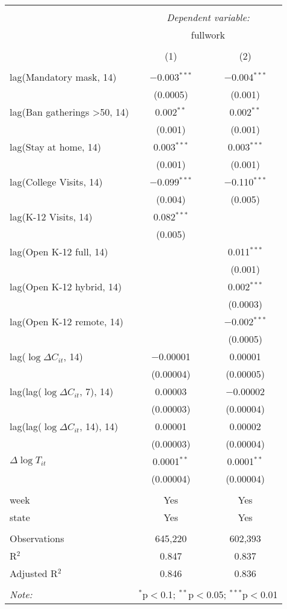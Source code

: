 \begin{tabular}{@{\extracolsep{1pt}}lcc} 
\\[-1.8ex]\hline 
\hline \\[-1.8ex] 
 & \multicolumn{2}{c}{\textit{Dependent variable:}} \\ 
\cline{2-3} 
 & \multicolumn{2}{c}{fullwork} \\ 
\\[-1.8ex] & (1) & (2)\\ 
\hline \\[-1.8ex] 
 lag(Mandatory mask, 14) & $-$0.003$^{***}$ & $-$0.004$^{***}$ \\ 
  & (0.0005) & (0.001) \\ 
  lag(Ban gatherings >50, 14) & 0.002$^{**}$ & 0.002$^{**}$ \\ 
  & (0.001) & (0.001) \\ 
  lag(Stay at home, 14) & 0.003$^{***}$ & 0.003$^{***}$ \\ 
  & (0.001) & (0.001) \\ 
  lag(College Visits, 14) & $-$0.099$^{***}$ & $-$0.110$^{***}$ \\ 
  & (0.004) & (0.005) \\ 
  lag(K-12 Visits, 14) & 0.082$^{***}$ &  \\ 
  & (0.005) &  \\ 
  lag(Open K-12 full, 14) &  & 0.011$^{***}$ \\ 
  &  & (0.001) \\ 
  lag(Open K-12 hybrid, 14) &  & 0.002$^{***}$ \\ 
  &  & (0.0003) \\ 
  lag(Open K-12 remote, 14) &  & $-$0.002$^{***}$ \\ 
  &  & (0.0005) \\ 
  lag($\log \Delta C_{it}$, 14) & $-$0.00001 & 0.00001 \\ 
  & (0.00004) & (0.00005) \\ 
  lag(lag($\log \Delta C_{it}$, 7), 14) & 0.00003 & $-$0.00002 \\ 
  & (0.00003) & (0.00004) \\ 
  lag(lag($\log \Delta C_{it}$, 14), 14) & 0.00001 & 0.00002 \\ 
  & (0.00003) & (0.00004) \\ 
  $\Delta \log T_{it}$ & 0.0001$^{**}$ & 0.0001$^{**}$ \\ 
  & (0.00004) & (0.00004) \\ 
 \hline \\[-1.8ex] 
week & Yes & Yes \\ 
state & Yes & Yes \\ 
\hline \\[-1.8ex] 
Observations & 645,220 & 602,393 \\ 
R$^{2}$ & 0.847 & 0.837 \\ 
Adjusted R$^{2}$ & 0.846 & 0.836 \\ 
\hline 
\hline \\[-1.8ex] 
\textit{Note:}  & \multicolumn{2}{r}{$^{*}$p$<$0.1; $^{**}$p$<$0.05; $^{***}$p$<$0.01} \\ 
\end{tabular} 